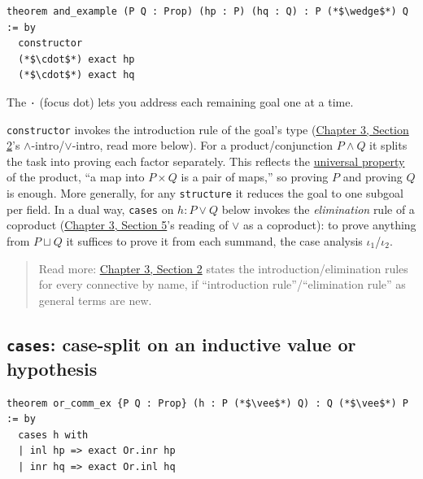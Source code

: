 \begin{lstlisting}
theorem and_example (P Q : Prop) (hp : P) (hq : Q) : P (*$\wedge$*) Q := by
  constructor
  (*$\cdot$*) exact hp
  (*$\cdot$*) exact hq
\end{lstlisting}

The \texttt{·} (focus dot) lets you address each remaining goal one at a time.

\begin{mathreading}

\texttt{constructor} invokes the introduction rule of the goal's type (\hyperref[sec:03-propositions-and-proofs:02-logic-recap:1]{Chapter 3, Section 2}'s \(\wedge\)-intro/\(\vee\)-intro, read more below). For a product/conjunction \(P \wedge Q\) it splits the task into proving each factor separately. This reflects the \hyperref[sec:01-basics:04-terminology:1]{universal property} of the product, ``a map into \(P \times Q\) is a pair of maps,'' so proving \(P\) and proving \(Q\) is enough. More generally, for any \texttt{structure} it reduces the goal to one subgoal per field. In a dual way, \texttt{cases} on \(h : P \vee Q\) below invokes the \emph{elimination} rule of a coproduct (\hyperref[sec:03-propositions-and-proofs:05-and-or-not:1]{Chapter 3, Section 5}'s reading of \(\vee\) as a coproduct): to prove anything from \(P \sqcup Q\) it suffices to prove it from each summand, the case analysis \(\iota_1\)/\(\iota_2\).

\end{mathreading}

\begin{quote}
Read more: \hyperref[sec:03-propositions-and-proofs:02-logic-recap:1]{Chapter 3, Section 2} states the introduction/elimination rules for every connective by name, if ``introduction rule''/``elimination rule'' as general terms are new.
\end{quote}

\subsection{\texorpdfstring{\texttt{cases}: case-split on an inductive value or hypothesis}{cases: case-split on an inductive value or hypothesis}}\label{sec:04-tactics:04-more-tactics:4}

\begin{lstlisting}
theorem or_comm_ex {P Q : Prop} (h : P (*$\vee$*) Q) : Q (*$\vee$*) P := by
  cases h with
  | inl hp => exact Or.inr hp
  | inr hq => exact Or.inl hq
\end{lstlisting}

